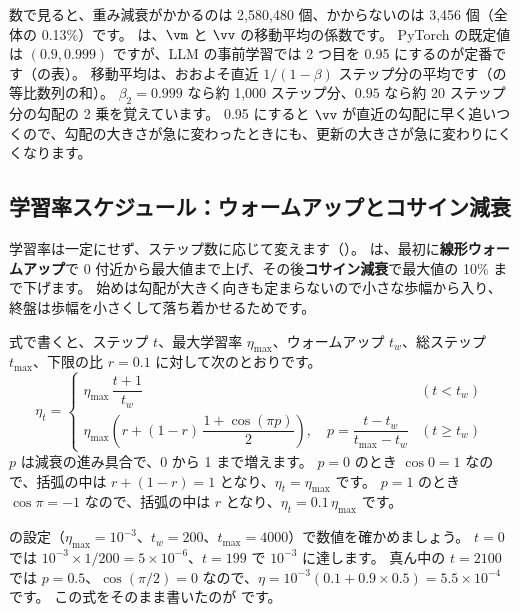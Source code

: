 数で見ると、重み減衰がかかるのは 2,580,480 個、かからないのは 3,456 個（全体の 0.13\%）です。
 は、$\vm$ と $\vv$ の移動平均の係数です。
PyTorch の既定値は $(0.9, 0.999)$ ですが、LLM の事前学習では 2 つ目を 0.95 にするのが定番です（の表）。
移動平均は、おおよそ直近 $1/(1-\beta)$ ステップ分の平均です（の等比数列の和）。
$\beta_2=0.999$ なら約 1,000 ステップ分、$0.95$ なら約 20 ステップ分の勾配の 2 乗を覚えています。
0.95 にすると $\vv$ が直近の勾配に早く追いつくので、勾配の大きさが急に変わったときにも、更新の大きさが急に変わりにくくなります。


\subsection{学習率スケジュール：ウォームアップとコサイン減衰}

学習率は一定にせず、ステップ数に応じて変えます（）。
 は、最初に\textbf{線形ウォームアップ}で 0 付近から最大値まで上げ、その後\textbf{コサイン減衰}で最大値の 10\% まで下げます。
始めは勾配が大きく向きも定まらないので小さな歩幅から入り、終盤は歩幅を小さくして落ち着かせるためです。

式で書くと、ステップ $t$、最大学習率 $\eta_{\max}$、ウォームアップ $t_w$、総ステップ $t_{\max}$、下限の比 $r=0.1$ に対して次のとおりです。
\begin{equation}
\eta_t =
\begin{cases}
\eta_{\max}\,\dfrac{t+1}{t_w} & (t < t_w)\\[2mm]
\eta_{\max}\left(r + (1-r)\,\dfrac{1+\cos(\pi p)}{2}\right),\quad p=\dfrac{t-t_w}{t_{\max}-t_w} & (t \ge t_w)
\end{cases}
\label{eq:pt-lr}
\end{equation}
$p$ は減衰の進み具合で、0 から 1 まで増えます。
$p=0$ のとき $\cos 0 = 1$ なので、括弧の中は $r + (1-r) = 1$ となり、$\eta_t=\eta_{\max}$ です。
$p=1$ のとき $\cos\pi=-1$ なので、括弧の中は $r$ となり、$\eta_t = 0.1\,\eta_{\max}$ です。

 の設定（$\eta_{\max}=10^{-3}$、$t_w=200$、$t_{\max}=4000$）で数値を確かめましょう。
$t=0$ では $10^{-3}\times 1/200 = 5\times10^{-6}$、$t=199$ で $10^{-3}$ に達します。
真ん中の $t=2100$ では $p=0.5$、$\cos(\pi/2)=0$ なので、$\eta = 10^{-3}(0.1 + 0.9\times 0.5)=5.5\times10^{-4}$ です。
この式をそのまま書いたのが  です。

